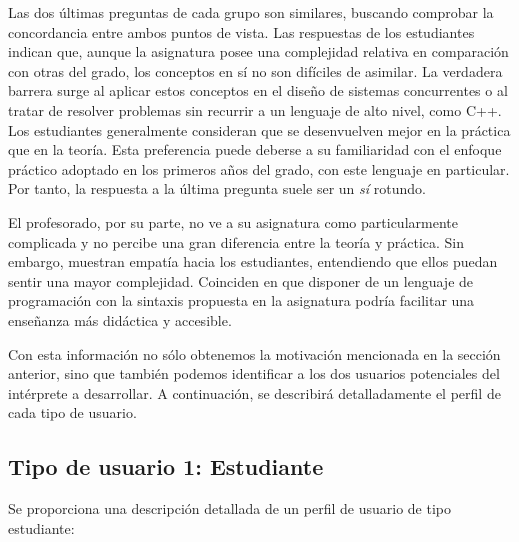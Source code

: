 \vspace{0.5cm}
Las dos últimas preguntas de cada grupo son similares, buscando comprobar la concordancia entre ambos puntos de vista. Las respuestas de los estudiantes indican que, aunque la asignatura posee una complejidad relativa en comparación con otras del grado, los conceptos en sí no son difíciles de asimilar. La verdadera barrera surge al aplicar estos conceptos en el diseño de sistemas concurrentes o al tratar de resolver problemas sin recurrir a un lenguaje de alto nivel, como C++. Los estudiantes generalmente consideran que se desenvuelven mejor en la práctica que en la teoría. Esta preferencia puede deberse a su familiaridad con el enfoque práctico adoptado en los primeros años del grado, con este lenguaje en particular. Por tanto, la respuesta a la última pregunta suele ser un \textit{sí} rotundo.

\vspace{0.5cm}
El profesorado, por su parte, no ve a su asignatura como particularmente complicada y no percibe una gran diferencia entre la teoría y práctica. Sin embargo, muestran empatía hacia los estudiantes, entendiendo que ellos puedan sentir una mayor complejidad. Coinciden en que disponer de un lenguaje de programación con la sintaxis propuesta en la asignatura podría facilitar una enseñanza más didáctica y accesible.

\vspace{0.5cm}
Con esta información no sólo obtenemos la motivación mencionada en la sección anterior, sino que también podemos identificar a los dos usuarios potenciales del intérprete a desarrollar. A continuación, se describirá detalladamente el perfil de cada tipo de usuario.

\subsection{Tipo de usuario 1: Estudiante}
Se proporciona una descripción detallada de un perfil de usuario de tipo estudiante:

